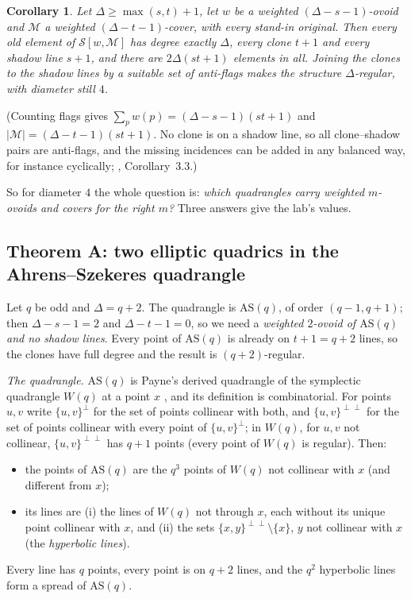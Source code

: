 \documentclass[11pt]{amsart}
\newtheorem{corollary}[theorem]{Corollary}
\theoremstyle{definition}
\theoremstyle{remark}
\newcommand{\cS}{\mathcal{S}}
\newcommand{\cM}{\mathcal{M}}
\begin{document}
\begin{corollary}\label{cor:exact}
Let $\Delta\ge\max(s,t)+1$, let $w$ be a weighted $(\Delta-s-1)$-ovoid and $\cM$ a weighted $(\Delta-t-1)$-cover, with every stand-in original. Then every old element of $\cS[w,\cM]$ has degree exactly $\Delta$, every clone $t+1$ and every shadow line $s+1$, and there are $2\Delta(st+1)$ elements in all. Joining the clones to the shadow lines by a suitable set of anti-flags makes the structure $\Delta$-regular, with diameter still $4$.
\end{corollary}

(Counting flags gives $\sum_pw(p)=(\Delta-s-1)(st+1)$ and $|\cM|=(\Delta-t-1)(st+1)$. No clone is on a shadow line, so all clone--shadow pairs are anti-flags, and the missing incidences can be added in any balanced way, for instance cyclically; , Corollary~3.3.)

So for diameter $4$ the whole question is: \emph{which quadrangles carry weighted $m$-ovoids and covers for the right $m$?} Three answers give the lab's values.

\subsection{Theorem A: two elliptic quadrics in the Ahrens--Szekeres quadrangle}\label{ssec:A}
Let $q$ be odd and $\Delta=q+2$. The quadrangle is $\mathrm{AS}(q)$, of order $(q-1,q+1)$; then $\Delta-s-1=2$ and $\Delta-t-1=0$, so we need a \emph{weighted $2$-ovoid of $\mathrm{AS}(q)$ and no shadow lines}. Every point of $\mathrm{AS}(q)$ is already on $t+1=q+2$ lines, so the clones have full degree and the result is $(q+2)$-regular.

\emph{The quadrangle.} $\mathrm{AS}(q)$ is Payne's derived quadrangle of the symplectic quadrangle $W(q)$ at a point $x$ \cite{P71,PT}, and its definition is combinatorial. For points $u,v$ write $\{u,v\}^\perp$ for the set of points collinear with both, and $\{u,v\}^{\perp\perp}$ for the set of points collinear with every point of $\{u,v\}^\perp$; in $W(q)$, for $u,v$ not collinear, $\{u,v\}^{\perp\perp}$ has $q+1$ points (every point of $W(q)$ is regular). Then:
\begin{itemize}[leftmargin=1.5em]
\item the points of $\mathrm{AS}(q)$ are the $q^3$ points of $W(q)$ not collinear with $x$ (and different from $x$);
\item its lines are (i) the lines of $W(q)$ not through $x$, each without its unique point collinear with $x$, and (ii) the sets $\{x,y\}^{\perp\perp}\setminus\{x\}$, $y$ not collinear with $x$ (the \emph{hyperbolic lines}).
\end{itemize}
Every line has $q$ points, every point is on $q+2$ lines, and the $q^2$ hyperbolic lines form a spread of $\mathrm{AS}(q)$.
\end{document}
